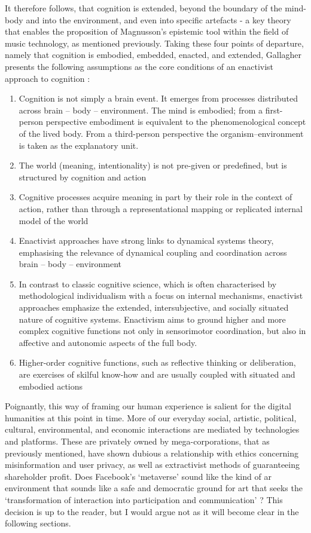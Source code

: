 It therefore follows, that cognition is extended, beyond the boundary of the mind-body and into the environment, and even into specific artefacts - a key theory that enables the proposition of Magnusson's epistemic tool within the field of music technology, as mentioned previously. Taking these four points of departure, namely that cognition is embodied, embedded, enacted, and extended, Gallagher presents the following assumptions as the core conditions of an enactivist approach to cognition \citep[p. 6]{gallagher2017}:
\begin{enumerate}
    \item Cognition is not simply a brain event. It emerges from processes distributed across brain – body – environment. The mind is embodied; from a first-person perspective embodiment is equivalent to the phenomenological concept of the lived body. From a third-person perspective the organism–environment is taken as the explanatory unit.
    \item The world (meaning, intentionality) is not pre-given or predefined, but is structured by cognition and action
    \item Cognitive processes acquire meaning in part by their role in the context of action, rather than through a representational mapping or replicated internal model of the world
    \item Enactivist approaches have strong links to dynamical systems theory, emphasising the relevance of dynamical coupling and coordination across brain – body – environment
    \item In contrast to classic cognitive science, which is often characterised by methodological individualism with a focus on internal mechanisms, enactivist approaches emphasize the extended, intersubjective, and socially situated nature of cognitive systems. Enactivism aims to ground higher and more complex cognitive functions not only in sensorimotor coordination, but also in affective and autonomic aspects of the full body.
    \item Higher-order cognitive functions, such as reflective thinking or deliberation, are exercises of skilful know-how and are usually coupled with situated and embodied actions
\end{enumerate}
Poignantly, this way of framing our human experience is salient for the digital humanities at this point in time. More of our everyday social, artistic, political, cultural, environmental, and economic interactions are mediated by technologies and platforms. These are privately owned by mega-corporations, that as previously mentioned, have shown dubious a relationship with ethics concerning misinformation and user privacy, as well as extractivist methods of guaranteeing shareholder profit. Does Facebook's `metaverse' sound like the kind of \gls{ar} environment that sounds like a safe and democratic ground for art that seeks the `transformation of interaction into participation and communication' \citep[]{dewey1934}? This decision is up to the reader, but I would argue not as it will become clear in the following sections.

